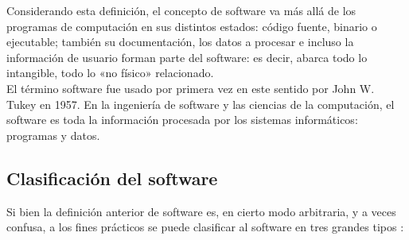 \documentclass[12pt]{book} %
\begin{document}
		Considerando esta definición, el concepto de software va más allá de los programas de computación en sus distintos estados: 
		código fuente, binario o ejecutable; también su documentación, los datos a procesar e incluso la información de usuario forman
		parte del software: es decir, abarca todo lo intangible, todo lo «no físico» relacionado.\\
		
		El término software fue usado por primera vez en este sentido por John W. Tukey en 1957. En la ingeniería de software y las
		ciencias de la computación, el software es toda la información procesada por los sistemas informáticos: programas y datos.
		
	\subsection{Clasificación del software \label{clasSoft}}
		Si bien la definición anterior de software es, en cierto modo arbitraria, y a veces confusa, a los fines prácticos se puede
		clasificar al software en tres grandes tipos \cite{IngSoft}:
		
\end{document}
